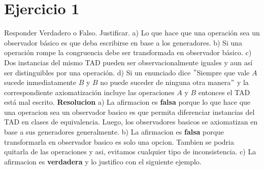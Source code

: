 \documentclass[10pt,a4paper]{article}
\begin{document}
\maketitle

\section{Ejercicio 1}

Responder Verdadero o Falso. Justificar.
\newline
\newline
a) Lo que hace que una operación sea un observador básico es que deba escribirse en base a los generadores.
\newline
\newline
b) Si una operación rompe la congruencia debe ser transformada en observador básico.
\newline
\newline
c) Dos instancias del mismo TAD pueden ser observacionalmente iguales y aun así ser distinguibles por una operación.
\newline
\newline
d) Si un enunciado dice $"$Siempre que vale $A$ sucede inmediatamente $B$ y $B$ no puede suceder de ninguna otra manera$"$ y la correspondiente axiomatización incluye las operaciones $A$ y $B$ entonces el TAD está mal escrito.
\newline
\newline
\textbf{Resolucion}
\newline
\newline
a) La afirmacion es \textbf{falsa} porque lo que hace que una operacion sea un observador basico es que permita diferenciar instancias del TAD en clases de equivalencia. Luego, los observadores basicos se axiomatizan en base a sus generadores generalmente. 
\newline
\newline
b) La afirmacion es \textbf{falsa} porque transformarla en observador basico es solo una opcion. Tambien se podria quitarla de las operaciones y asi, evitamos cualquier tipo de inconsistencia.   
\newline
\newline
c) La afirmacion es \textbf{verdadera} y lo justifico con el siguiente ejemplo.
\newline
\begin{tad}{}
	\medskip
	\tadObservadores
	\medskip
	\medskip
	\tadGeneradores
	\medskip
	\medskip
	\medskip
	\medskip
	
	\tadOtrasOperaciones
	\medskip
	\medskip
\end{tad}
\end{document}
